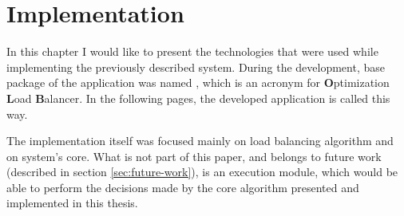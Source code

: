\chapter{Implementation}\label{ch:implementation}
In this chapter I would like to present the technologies that were used while implementing the previously described system.
During the development,
base package of the application was named ,
which is an acronym for \textbf{O}ptimization \textbf{L}oad \textbf{B}alancer.
In the following pages, 
the developed application is called this way.

The implementation itself was focused mainly on load balancing algorithm 
and on system's core.
What is not part of this paper,
and belongs to future work (described in section \ref{sec:future-work}),
is an execution module, 
which would be able to perform the decisions made by the core algorithm presented 
and implemented in this thesis.







